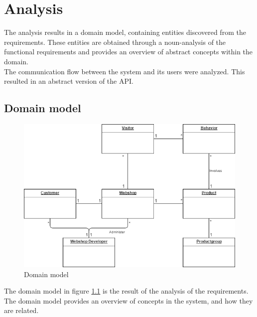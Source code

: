 
\chapter{Analysis} %

\label{Analysis} %


The analysis results in a domain model, containing entities discovered from the requirements. These entities are obtained through a noun-analysis of the functional requirements and provides an overview of abstract concepts within the domain.\\
The communication flow between the system and its users were analyzed. This resulted in an abstract version of the API.

\section{Domain model}
\begin{figure}[H]
	\centering
	\includegraphics[width=.8\linewidth]{Figures/Domain_model.png}
	\caption{Domain model}
	\label{fig:DomainModel}
\end{figure}

The domain model in figure \ref{fig:DomainModel} is the result of the analysis of the requirements. The domain model provides an overview of concepts in the system, and how they are related.

